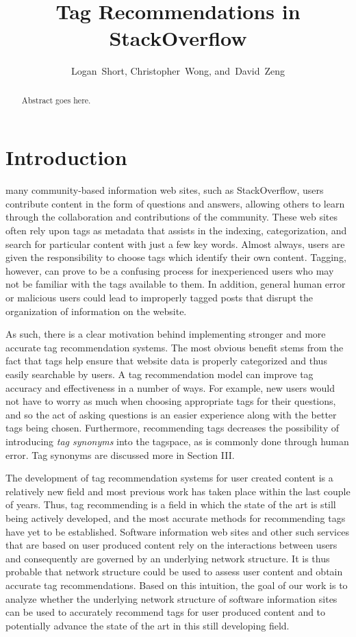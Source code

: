 \documentclass[10pt]{IEEEtran}
\begin{document}
\title{Tag Recommendations in StackOverflow}
\author{Logan~Short, Christopher~Wong, and~David~Zeng}%
\maketitle

\begin{abstract}
Abstract goes here.
\end{abstract}

\section{Introduction}

 many community-based information web sites, such as StackOverflow, users contribute content in the form of questions and answers, allowing others to learn through the collaboration and contributions of the community. These web sites often rely upon tags as metadata that assists in the indexing, categorization, and search for particular content with just a few key words. Almost always, users are given the responsibility to choose tags which identify their own content. Tagging, however, can prove to be a confusing process for inexperienced users who may not be familiar with the tags available to them. In addition, general human error or malicious users could lead to improperly tagged posts that disrupt the organization of information on the website.

As such, there is a clear motivation behind implementing stronger and more accurate tag recommendation systems. The most obvious benefit stems from the fact that tags help ensure that website data is properly categorized and thus easily searchable by users. A tag recommendation model can improve tag accuracy and effectiveness in a number of ways. For example, new users would not have to worry as much when choosing appropriate tags for their questions, and so the act of asking questions is an easier experience along with the better tags being chosen. Furthermore, recommending tags decreases the possibility of introducing \textit{tag synonyms} into the tagspace, as is commonly done through human error. Tag synonyms are discussed more in Section III.

The development of tag recommendation systems for user created content is a relatively new field and most previous work has taken place within the last couple of years. Thus, tag recommending is a field in which the state of the art is still being actively developed, and the most accurate methods for recommending tags have yet to be established. Software information web sites and other such services that are based on user produced content rely on the interactions between users and consequently are governed by an underlying network structure. It is thus probable that network structure could be used to assess user content and obtain accurate tag recommendations. Based on this intuition, the goal of our work is to analyze whether the underlying network structure of software information sites can be used to accurately recommend tags for user produced content and to potentially advance the state of the art in this still developing field.
\end{document}

